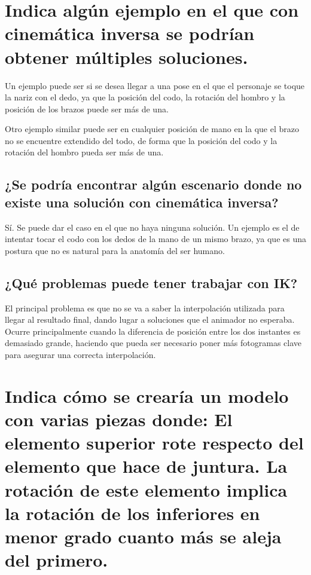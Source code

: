 \documentclass{article}
\begin{document}
\section{Indica algún ejemplo en el que con cinemática inversa se podrían obtener múltiples soluciones.}

Un ejemplo puede ser si se desea llegar a una pose en el que el personaje se toque la nariz con el dedo, ya que la posición del codo, la rotación del hombro y la posición de los brazos puede ser más de una.

Otro ejemplo similar puede ser en cualquier posición de mano en la que el brazo no se encuentre extendido del todo, de forma que la posición del codo y la rotación del hombro pueda ser más de una.

\subsection{¿Se podría encontrar algún escenario donde no existe una solución con cinemática inversa?}

Sí. Se puede dar el caso en el que no haya ninguna solución. Un ejemplo es el de intentar tocar el codo con los dedos de la mano de un mismo brazo, ya que es una postura que no es natural para la anatomía del ser humano.

\subsection{¿Qué problemas puede tener trabajar con IK?}

El principal problema es que no se va a saber la interpolación utilizada para llegar al resultado final, dando lugar a soluciones que el animador no esperaba. Ocurre principalmente cuando la diferencia de posición entre los dos instantes es demasiado grande, haciendo que pueda ser necesario poner más fotogramas clave para asegurar una correcta interpolación.

\section{Indica cómo se crearía un modelo con varias piezas donde: El elemento superior rote respecto del elemento que hace de juntura. La rotación de este elemento implica la rotación de los inferiores en menor grado cuanto más se aleja del primero.}
\end{document}
